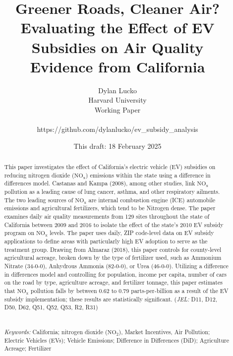 \documentclass[12pt]{article}
\begin{document}
	
	
	\title{%
		Greener Roads, Cleaner Air? Evaluating the Effect of EV Subsidies on Air Quality\\  
		\Large
		Evidence from California}
	\author{Dylan Lucko\\ Harvard University\\ Working Paper\\  \\ https://github.com/dylanlucko/ev\_subsidy\_analysis}
	\date{This draft: 18 February 2025}
	
	\maketitle
	
	
	\bigskip
	\bigskip
	\bigskip
	\bigskip
	\bigskip
	\bigskip
	\bigskip
	\bigskip
	
	
	\begin{abstract}
		\smallskip
		This paper investigates the effect of California's electric vehicle (EV) subsidies on reducing nitrogen dioxide ($\text{NO}_\text{x}$) emissions within the state using a difference in differences model. Castanas and Kampa (2008), among other studies, link $\text{NO}_\text{x}$ pollution as a leading cause of lung cancer, asthma, and other respiratory ailments. The two leading sources of $\text{NO}_\text{x}$ are internal combustion engine (ICE) automobile emissions and agricultural fertilizers, which tend to be Nitrogen dense. The paper examines daily air quality measurements from 129 sites throughout the state of California between 2009 and 2016 to isolate the effect of the state's 2010 EV subsidy program on $\text{NO}_\text{x}$ levels. The paper uses daily, ZIP code-level data on EV subsidy applications to define areas with particularly high EV adoption to serve as the treatment group. Drawing from Almaraz (2018), this paper controls for county-level agricultural acreage, broken down by the type of fertilizer used, such as Ammonium Nitrate (34-0-0), Anhydrous Ammonia (82-0-0), or Urea (46-0-0). Utilizing a difference in differences model and controlling for population, income per capita, number of cars on the road by type, agriculture acreage, and fertilizer tonnage, this paper estimates that $\text{NO}_\text{x}$ pollution falls by between 0.62 to 0.79 parts-per-billion as a result of the EV subsidy implementation; these results are statistically significant. (\emph{JEL:} D11, D12, D50, D62, Q51, Q52, Q53, R2, R31)
		\\
		\\\\
		\emph{Keywords:} California; nitrogen dioxide ($\text{NO}_\text{2}$), Market Incentives, Air Pollution; Electric Vehicles (EVs); Vehicle Emissions; Difference in Differences (DiD); Agriculture Acreage; Fertilizer
	\end{abstract}
	\newpage
	\tableofcontents
	\newpage
	
\end{document}
